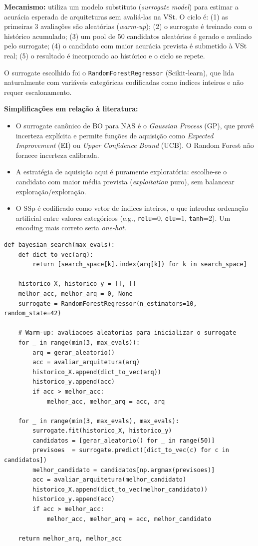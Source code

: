 \documentclass[a4paper,12pt]{article}
\begin{document}
\textbf{Mecanismo:} utiliza um modelo substituto (\textit{surrogate model}) para estimar a acurácia esperada de arquiteturas sem avaliá-las na VSt. O ciclo é: (1) as primeiras 3 avaliações são aleatórias (\textit{warm-up}); (2) o surrogate é treinado com o histórico acumulado; (3) um pool de 50 candidatos aleatórios é gerado e avaliado pelo surrogate; (4) o candidato com maior acurácia prevista é submetido à VSt real; (5) o resultado é incorporado ao histórico e o ciclo se repete.

O surrogate escolhido foi o \texttt{RandomForestRegressor} (Scikit-learn), que lida naturalmente com variáveis categóricas codificadas como índices inteiros e não requer escalonamento.

\textbf{Simplificações em relação à literatura:}
\begin{itemize}[noitemsep]
    \item O surrogate canônico de BO para NAS é o \textit{Gaussian Process} (GP), que provê incerteza explícita e permite funções de aquisição como \textit{Expected Improvement} (EI) ou \textit{Upper Confidence Bound} (UCB). O Random Forest não fornece incerteza calibrada.
    \item A estratégia de aquisição aqui é puramente exploratória: escolhe-se o candidato com maior média prevista (\textit{exploitation} puro), sem balancear exploração/exploração.
    \item O SSp é codificado como vetor de índices inteiros, o que introduz ordenação artificial entre valores categóricos (e.g., \texttt{relu}=0, \texttt{elu}=1, \texttt{tanh}=2). Um encoding mais correto seria \textit{one-hot}.
\end{itemize}

\begin{lstlisting}[style=python, caption={Bayesian Optimization com surrogate Random Forest.}]
def bayesian_search(max_evals):
    def dict_to_vec(arq):
        return [search_space[k].index(arq[k]) for k in search_space]

    historico_X, historico_y = [], []
    melhor_acc, melhor_arq = 0, None
    surrogate = RandomForestRegressor(n_estimators=10, random_state=42)

    # Warm-up: avaliacoes aleatorias para inicializar o surrogate
    for _ in range(min(3, max_evals)):
        arq = gerar_aleatorio()
        acc = avaliar_arquitetura(arq)
        historico_X.append(dict_to_vec(arq))
        historico_y.append(acc)
        if acc > melhor_acc:
            melhor_acc, melhor_arq = acc, arq

    for _ in range(min(3, max_evals), max_evals):
        surrogate.fit(historico_X, historico_y)
        candidatos = [gerar_aleatorio() for _ in range(50)]
        previsoes  = surrogate.predict([dict_to_vec(c) for c in candidatos])
        melhor_candidato = candidatos[np.argmax(previsoes)]
        acc = avaliar_arquitetura(melhor_candidato)
        historico_X.append(dict_to_vec(melhor_candidato))
        historico_y.append(acc)
        if acc > melhor_acc:
            melhor_acc, melhor_arq = acc, melhor_candidato

    return melhor_arq, melhor_acc
\end{lstlisting}
\end{document}
